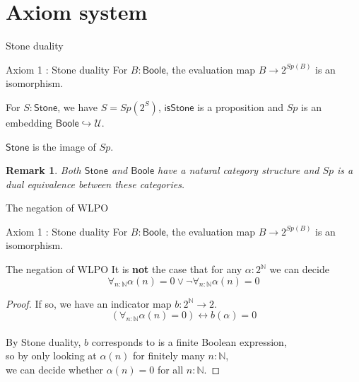 \documentclass{beamer}
\newcommand{\Type}{\mathcal U}
\newcommand{\Boole}{\mathsf{Boole}}
\newcommand{\Stone}{\mathsf{Stone}}
\newcommand{\isSt}{\mathsf{isStone}}
\newtheorem{remark}{Remark}
\begin{document}
\section{Axiom system}
\begin{frame}{Stone duality}
  \begin{block}{Axiom 1 : Stone duality}
    For $B:\Boole$, the evaluation map $B \to 2^{Sp(B)}$ is an isomorphism. 
  \end{block}
  \pause
  \begin{corollary}
    For $S:\Stone$, we have $S = Sp(2^S)$,
    \pause 
    $\isSt$ is a proposition \pause and
    $Sp$ is an embedding $\Boole \hookrightarrow \Type$. 
  \end{corollary}
  \pause
  \begin{definition}
    $\Stone$ is the image of $Sp$. 
  \end{definition}
  \pause
  \begin{remark}
    Both $\Stone$ and $\Boole$ have a natural category structure and $Sp$
    is a dual equivalence between these categories. 
  \end{remark}
\end{frame}
\begin{frame}{The negation of WLPO}
  \begin{block}{Axiom 1 : Stone duality}
    For $B:\Boole$, the evaluation map $B \to 2^{Sp(B)}$ is an isomorphism. 
  \end{block}
  \pause
  \begin{block}{The negation of WLPO}
    It is \textbf{not} the case that for any $\alpha:2^\mathbb N$ we can decide 
    \vspace{-0.2cm}
    $$\forall_{n:\mathbb N} \alpha (n) = 0 \vee \neg \forall_{n:\mathbb N} \alpha (n) = 0 $$
  \end{block}
  \pause
  \begin{proof}
    If so, we have an indicator map $b:2^\mathbb N \to 2$. 
    \vspace{-0.2cm}
    $$(\forall_{n:\mathbb N} \alpha(n) = 0 )\leftrightarrow b(\alpha) = 0$$
    \vspace{-0.8cm}
    \\
    \pause 
    By Stone duality, $b$ corresponds to is a finite Boolean expression, \pause \\
    so by only looking at $\alpha(n)$ for finitely many $n:\mathbb N$, \pause \\
    we can decide whether $\alpha(n) = 0$ for all $n:\mathbb N$.
  \end{proof}
\end{frame}
\end{document}
